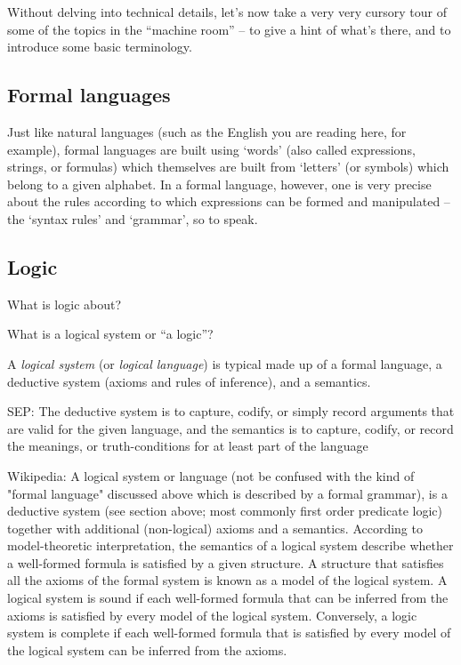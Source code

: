 Without delving into technical details, let's now take a very very cursory tour of some of the topics in the ``machine room'' -- to give a hint of what's there, and to introduce some basic terminology.

\subsection{Formal languages}

Just like natural languages (such as the English you are reading here, for example), formal languages are built using `words' (also called expressions, strings, or formulas) which themselves are built from `letters' (or symbols) which belong to a given alphabet.
In a formal language, however, one is very precise about the rules according to which expressions can be formed and manipulated -- the `syntax rules' and `grammar', so to speak.


\subsection{Logic}

What is logic about?

What is a logical system or ``a logic''?

A \emph{logical system} (or \emph{logical language}) is typical made up of a formal language, a deductive system (axioms and rules of inference), and a semantics.

SEP: The deductive system is to capture, codify, or simply record arguments that are valid for the given language, and the semantics is to capture, codify, or record the meanings, or truth-conditions for at least part of the language

Wikipedia: A logical system or language (not be confused with the kind of "formal language" discussed above which is described by a formal grammar), is a deductive system (see section above; most commonly first order predicate logic) together with additional (non-logical) axioms and a semantics.
According to model-theoretic interpretation, the semantics of a logical system describe whether a well-formed formula is satisfied by a given structure.
A structure that satisfies all the axioms of the formal system is known as a model of the logical system.
A logical system is sound if each well-formed formula that can be inferred from the axioms is satisfied by every model of the logical system.
Conversely, a logic system is complete if each well-formed formula that is satisfied by every model of the logical system can be inferred from the axioms.

